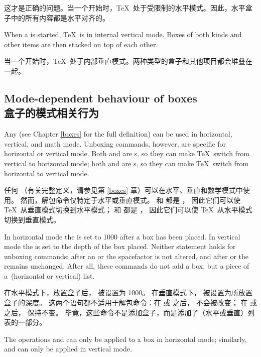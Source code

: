 这才是正确的问题。当一个开始时，\TeX\ 处于受限制的水平模式。因此，水平盒子中的所有内容都是水平对齐的。

When a  is started, \TeX\ is in internal vertical mode.
Boxes of both kinds and other items are then stacked
on top of each other.

当一个开始时，\TeX\ 处于内部垂直模式。两种类型的盒子和其他项目都会堆叠在一起。


\subsection{Mode-dependent behaviour of boxes\\盒子的模式相关行为}

Any  (see Chapter \ref{boxes} for the full definition)
can be used in horizontal, vertical, and math mode.
Unboxing commands, however, are specific for horizontal or vertical mode.
Both  and  are s,
so they can make \TeX\ switch from vertical to horizontal
mode; 
\awp
both  and  are s,
so they can make \TeX\ switch from horizontal to vertical
mode.

任何 （有关完整定义，请参见第 \ref{boxes} 章）可以在水平、垂直和数学模式中使用。
然而，解包命令仅特定于水平或垂直模式。
 和  都是 ，
因此它们可以使 \TeX\ 从垂直模式切换到水平模式；
 和  都是 ，
因此它们可以使 \TeX\ 从水平模式切换到垂直模式。

In horizontal mode the  is set to 1000
after a box has been placed. In vertical mode the
 is set to the depth of the box placed.
Neither statement holds for
unboxing commands: after an  or  the 
spacefactor is not altered, and after  or 
the  remains unchanged.
After all, these commands do not add a box,
but a piece of a~(horizontal or vertical) list.

在水平模式下，放置盒子后， 被设置为 1000。
在垂直模式下， 被设置为所放置盒子的深度。
这两个语句都不适用于解包命令：在  或  之后， 不会被改变；
在  或  之后， 保持不变。
毕竟，这些命令不是添加盒子，而是添加了（水平或垂直）列表的一部分。

The operations  and  can only be
applied to a box in horizontal mode; similarly,  and
 can only be applied in vertical mode.

